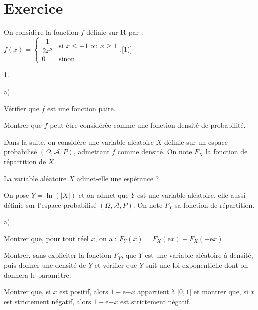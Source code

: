 \documentclass[11pt]{article}%
\begin{document}
\section*{Exercice}

On considère la fonction $f$ définie sur ${\mathbf{R}}$ par : $f(x) =
\left\{
\begin{array}{cl}
\dfrac{1}{2x^{2}} & \text{si }x\leq -1\text{ ou }x\geq 1 \\
0 & \text{sinon}
\end{array}
\right.$.[1)]

\begin{noliste}{1.}
 \setlength{\itemsep}{4mm}
\item 
\begin{noliste}{a)}
 \setlength{\itemsep}{2mm}
\item Vérifier que $f$ est une fonction paire.

\item Montrer que $f$ peut être considérée comme une fonction densité
de
probabilité.
\end{noliste}

Dans la suite, on considère une variable aléatoire $X$ définie sur un
espace
probabilisé $(\Omega,\mathcal{A},P)$, admettant $f$ comme densité. On
note $F_{X}$ la fonction de répartition de $X$.

\item La variable aléatoire $X$ admet-elle une espérance ?

\item On pose $Y = \ln (|X|)$ et on admet que $Y$ est une variable
aléatoire,
elle aussi définie sur l'espace probabilisé $(\Omega,\mathcal{A},P)$.
On
note $F_{Y}$ sa fonction de répartition.

\begin{noliste}{a)}
 \setlength{\itemsep}{2mm}
\item Montrer que, pour tout réel $x$, on a : $F_{Y}(x) =
F_{X}(\mathrm{e}{x})-F_{X}(-\mathrm{e}{x})$.

\item Montrer, sans expliciter la fonction $F_{Y}$, que $Y$ est une
variable
aléatoire à densité, puis donner une densité de $Y$ et vérifier que $Y$
suit
une loi exponentielle dont on donnera le paramètre.

\item 
Montrer que, si $x$ est positif, alors $1-\mathrm{e}{-x}$ appartient à
$[0,1[$ et montrer que, si $x$ est strictement négatif, alors
$1-\mathrm{e}{-x}$ est strictement négatif.


\end{noliste}
\end{noliste}
\end{document}
